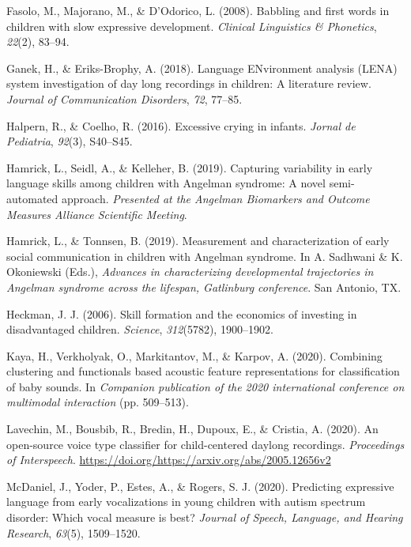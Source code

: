 \documentclass[english,,man]{apa6}
\begin{document}
\leavevmode\hypertarget{ref-fasolo2008babbling}{}%
Fasolo, M., Majorano, M., \& D'Odorico, L. (2008). Babbling and first words in children with slow expressive development. \emph{Clinical Linguistics \& Phonetics}, \emph{22}(2), 83--94.

\leavevmode\hypertarget{ref-ganek2018language}{}%
Ganek, H., \& Eriks-Brophy, A. (2018). Language ENvironment analysis (LENA) system investigation of day long recordings in children: A literature review. \emph{Journal of Communication Disorders}, \emph{72}, 77--85.

\leavevmode\hypertarget{ref-halpern2016excessive}{}%
Halpern, R., \& Coelho, R. (2016). Excessive crying in infants. \emph{Jornal de Pediatria}, \emph{92}(3), S40--S45.

\leavevmode\hypertarget{ref-hamrick2019capturing}{}%
Hamrick, L., Seidl, A., \& Kelleher, B. (2019). Capturing variability in early language skills among children with Angelman syndrome: A novel semi-automated approach. \emph{Presented at the Angelman Biomarkers and Outcome Measures Alliance Scientific Meeting}.

\leavevmode\hypertarget{ref-hamrick2019measurement}{}%
Hamrick, L., \& Tonnsen, B. (2019). Measurement and characterization of early social communication in children with Angelman syndrome. In A. Sadhwani \& K. Okoniewski (Eds.), \emph{Advances in characterizing developmental trajectories in Angelman syndrome across the lifespan, Gatlinburg conference}. San Antonio, TX.

\leavevmode\hypertarget{ref-heckman2006skill}{}%
Heckman, J. J. (2006). Skill formation and the economics of investing in disadvantaged children. \emph{Science}, \emph{312}(5782), 1900--1902.

\leavevmode\hypertarget{ref-kaya2020combining}{}%
Kaya, H., Verkholyak, O., Markitantov, M., \& Karpov, A. (2020). Combining clustering and functionals based acoustic feature representations for classification of baby sounds. In \emph{Companion publication of the 2020 international conference on multimodal interaction} (pp. 509--513).

\leavevmode\hypertarget{ref-lavechin2020open}{}%
Lavechin, M., Bousbib, R., Bredin, H., Dupoux, E., \& Cristia, A. (2020). An open-source voice type classifier for child-centered daylong recordings. \emph{Proceedings of Interspeech}. \url{https://doi.org/https://arxiv.org/abs/2005.12656v2}

\leavevmode\hypertarget{ref-mcdaniel2020predicting}{}%
McDaniel, J., Yoder, P., Estes, A., \& Rogers, S. J. (2020). Predicting expressive language from early vocalizations in young children with autism spectrum disorder: Which vocal measure is best? \emph{Journal of Speech, Language, and Hearing Research}, \emph{63}(5), 1509--1520.
\end{document}
